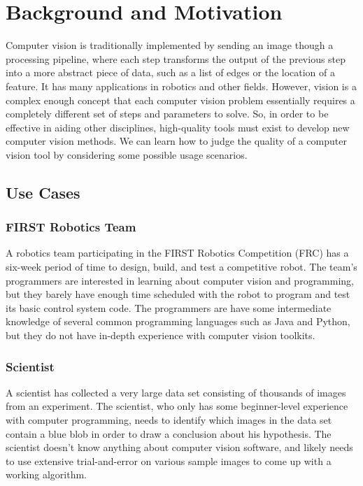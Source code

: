 \documentclass[12pt]{article}
\begin{document}

\section{Background and Motivation}
Computer vision is traditionally implemented by sending an image though a processing pipeline, where each step transforms the output of the previous step into a more abstract piece of data, such as a list of edges or the location of a feature.  It has many applications in robotics and other fields.  However, vision is a complex enough concept that each computer vision problem essentially requires a completely different set of steps and parameters to solve.  So, in order to be effective in aiding other disciplines, high-quality tools must exist to develop new computer vision methods.  We can learn how to judge the quality of a computer vision tool by considering some possible usage scenarios.

\subsection{Use Cases}

\subsubsection{FIRST Robotics Team}
A robotics team participating in the FIRST Robotics Competition (FRC) has a six-week period of time to design, build, and test a competitive robot.  The team's programmers are interested in learning about computer vision and programming, but they barely have enough time scheduled with the robot to program and test its basic control system code.  The programmers are have some intermediate knowledge of several common programming languages such as Java and Python, but they do not have in-depth experience with computer vision toolkits.

\subsubsection{Scientist}
A scientist has collected a very large data set consisting of thousands of images from an experiment.  The scientist, who only has some beginner-level experience with computer programming, needs to identify which images in the data set contain a blue blob in order to draw a conclusion about his hypothesis.  The scientist doesn't know anything about computer vision software, and likely needs to use extensive trial-and-error on various sample images to come up with a working algorithm.
\end{document}
